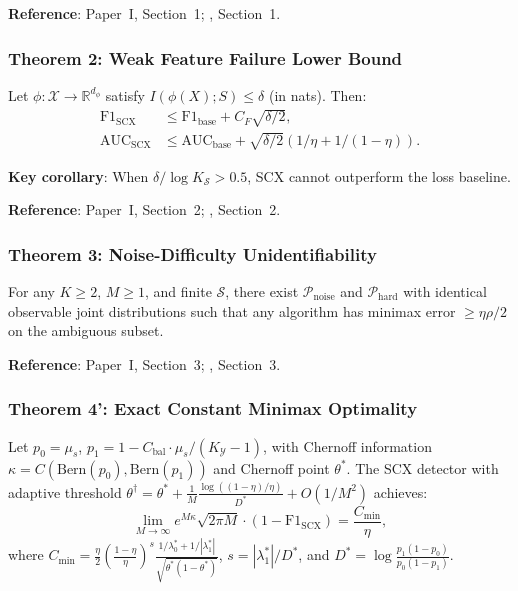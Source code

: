 \documentclass{article}
\begin{document}
\textbf{Reference}: Paper~I, Section~1; \cite{theorems_unified}, Section~1.

\subsubsection*{Theorem 2: Weak Feature Failure Lower Bound}
Let $\phi: \mathcal{X} \to \mathbb{R}^{d_\phi}$ satisfy $I(\phi(X); S) \leq \delta$ (in nats). Then:
\begin{align}
\text{F1}_{\text{SCX}} &\leq \text{F1}_{\text{base}} + C_F\sqrt{\delta/2}, \\
\text{AUC}_{\text{SCX}} &\leq \text{AUC}_{\text{base}} + \sqrt{\delta/2}(1/\eta + 1/(1-\eta)).
\end{align}

\textbf{Key corollary}: When $\delta / \log K_{\mathcal{S}} > 0.5$, SCX cannot outperform the loss baseline.

\textbf{Reference}: Paper~I, Section~2; \cite{theorems_unified}, Section~2.

\subsubsection*{Theorem 3: Noise-Difficulty Unidentifiability}
For any $K \geq 2$, $M \geq 1$, and finite $\mathcal{S}$, there exist $\mathcal{P}_{\text{noise}}$ and $\mathcal{P}_{\text{hard}}$ with identical observable joint distributions such that any algorithm has minimax error $\geq \eta\rho/2$ on the ambiguous subset.

\textbf{Reference}: Paper~I, Section~3; \cite{theorems_unified}, Section~3.

\subsubsection*{Theorem 4': Exact Constant Minimax Optimality}
Let $p_0 = \mu_s$, $p_1 = 1 - C_{\text{bal}}\cdot\mu_s/(K_{\mathcal{Y}}-1)$, with Chernoff information $\kappa = C(\text{Bern}(p_0), \text{Bern}(p_1))$ and Chernoff point $\theta^*$. The SCX detector with adaptive threshold $\theta^\dagger = \theta^* + \frac{1}{M}\frac{\log((1-\eta)/\eta)}{D^*} + O(1/M^2)$ achieves:
\begin{equation}
\lim_{M\to\infty} e^{M\kappa}\sqrt{2\pi M}\cdot(1-\text{F1}_{\text{SCX}}) = \frac{C_{\min}}{\eta},
\end{equation}
where $C_{\min} = \frac{\eta}{2}(\frac{1-\eta}{\eta})^s \frac{1/\lambda_0^* + 1/|\lambda_1^*|}{\sqrt{\theta^*(1-\theta^*)}}$, $s = |\lambda_1^*|/D^*$, and $D^* = \log\frac{p_1(1-p_0)}{p_0(1-p_1)}$.
\end{document}
